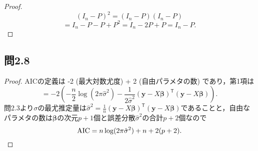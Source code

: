 \documentclass[pdflatex,ja=standard]{bxjsarticle}
\begin{document}
\begin{proof}
\begin{equation}
(I_n - P)^2 = (I_n - P) (I_n - P)
\end{equation}
\begin{equation}
= I_n - P - P + P^2 = I_n - 2P + P = I_n - P.
\end{equation}
\end{proof}

\subsection{問2.8}
\begin{proof}
AICの定義は -2 (最大対数尤度) + 2 (自由パラメタの数) であり，第1項は
\begin{equation}
= -2 \left( - \frac{n}{2} \log (2 \pi \hat{\sigma}^2) - \frac{1}{2 \hat{\sigma}^2} (\bm{y} - X \bm{\beta})^{\mathsf{T}} (\bm{y} - X \bm{\beta}) \right).
\end{equation}
問2.3より$\sigma$の最尤推定量は$\hat{\sigma}^2 = \frac{1}{n} (\bm{y} - X \bm{\beta})^{\mathsf{T}} (\bm{y} - X \bm{\beta})$であることと，自由なパラメタの数は$\bm{\beta}$の次元$p+1$個と誤差分散$\hat{\sigma}^2$の合計$p+2$個なので
\begin{equation}
{\rm AIC} = n \log (2 \pi \hat{\sigma}^2) + n + 2(p + 2).
\end{equation}
\end{proof}
\end{document}
